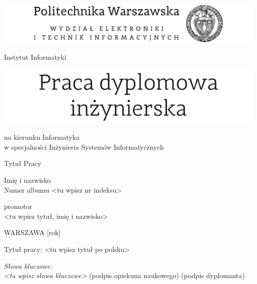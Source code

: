 


\thispagestyle{empty}
\center
\includegraphics[scale=1]{PolitechnikaWarszawska}

\vspace{12mm}

\normalsize
Instytut Informatyki


\center
\includegraphics[scale=1]{PracaDyplomowa}

\vspace{12mm}

\normalsize
na kierunku Informatyka \\ 
w specjalności Inżynieria Systemów Informatycznych \\

\vspace{15mm}

\Large 
Tytuł Pracy \\ 

\vspace{17mm}

\huge 
Imię i nazwisko  \\ 
\normalsize 
Numer albumu <tu wpisz nr indeksu>  \\ 

\vspace{17mm}

promotor \\
<tu wpisz tytuł, imię i nazwisko>  \\

\vspace{15mm}

WARSZAWA [rok] 

\newpage
\thispagestyle{empty}
\phantom{Nothing here}
\newpage
\clearpage
\phantom{Here neither}

\setcounter{page}{3}
\vspace{-1.5cm}
\begin{flushleft}
	Tytuł pracy: <tu wpisz tytuł po polsku> 
\end{flushleft}
\vspace{0.5cm}
\vspace{0.5cm}
\noindent \textit{Słowa kluczowe: \\ <tu wpisz słowa kluczowe>} 
\vfill
(podpis opiekuna naukowego) \hfill (podpis dyplomanta)

